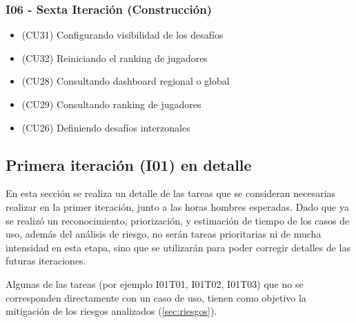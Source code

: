 \subsubsection{I06 - Sexta Iteración (Construcción)}
\begin{itemize}
\item (CU31) Configurando visibilidad de los desafíos
\item (CU32) Reiniciando el ranking de jugadores
\item (CU28) Consultando dashboard regional o global
\item (CU29) Consultando ranking de jugadores
\item (CU26) Definiendo desafíos interzonales
\end{itemize}


\subsection{Primera iteración (I01) en detalle}
\label{subsec:primeraiteracion}
En esta sección se realiza un detalle de las tareas que se consideran necesarias realizar en la primer iteración, junto a las horas hombres esperadas. Dado que ya se realizó un reconocimiento, priorización, y estimación de tiempo de los casos de uso, además del análisis de riesgo, no serán tareas prioritarias ni de mucha intensidad en esta etapa, sino que se utilizarán para poder corregir detalles de las futuras iteraciones.

Algunas de las tareas (por ejemplo I01T01, I01T02, I01T03) que no se corresponden directamente con un caso de uso, tienen como objetivo la mitigación de los riesgos analizados (\ref{sec:riesgos}).

